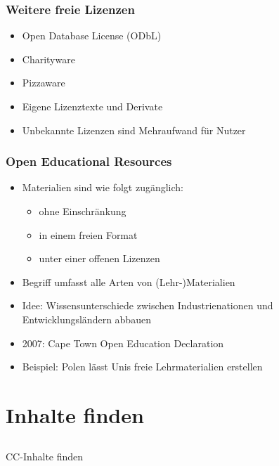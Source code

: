 \documentclass[table]{beamer}
\begin{document}
\begin{frame}
    \frametitle{Weitere freie Lizenzen}
    \begin{itemize}
        \item<2-> Open Database License (ODbL)
        \item<3-> Charityware
        \item<4-> Pizzaware
        \item<5-> Eigene Lizenztexte und Derivate
        \item<6-> Unbekannte Lizenzen sind Mehraufwand für Nutzer
    \end{itemize}
\end{frame}

\begin{frame}
  \frametitle{Open Educational Resources}
    \begin{itemize}
        \item<2-> Materialien sind wie folgt zugänglich:
            \begin{itemize}
                \item<3-> ohne Einschränkung
                \item<4-> in einem freien Format
                \item<5-> unter einer offenen Lizenzen 
            \end{itemize}
        \item<6-> Begriff umfasst alle Arten von (Lehr-)Materialien
        \item<7-> Idee: Wissensunterschiede zwischen Industrienationen und Entwicklungsländern abbauen
        \item<8-> 2007: Cape Town Open Education Declaration
        \item<9-> Beispiel: Polen lässt Unis freie Lehrmaterialien erstellen
    \end{itemize}
\end{frame}

\section{Inhalte finden}
\subsection{}

\begin{frame}
    \begin{center}\Large
    CC-Inhalte finden
    \end {center}
\end{frame}
\end{document}
